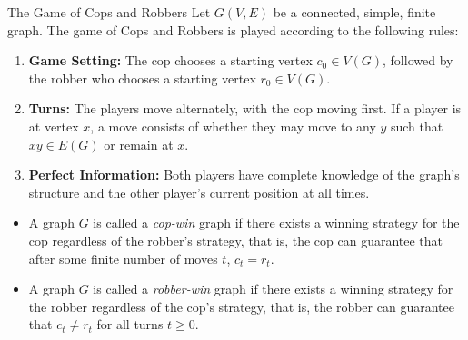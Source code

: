 \documentclass[12pt, a4paper]{article}
\begin{document}
\begin{definition}{The Game of Cops and Robbers}{}
Let $G(V, E)$ be a connected, simple, finite graph. The game of Cops and Robbers is played according to the following rules:
\begin{enumerate}
    \item \textbf{Game Setting:} The cop chooses a starting vertex $c_0 \in V(G)$, followed by the robber who chooses a starting vertex $r_0 \in V(G)$.
    \item \textbf{Turns:} The players move alternately, with the cop moving first. If a player is at vertex $x$, a move consists of whether they may move to any $y$ such that $xy \in E(G)$ or remain at $x$.
    \item \textbf{Perfect Information:} Both players have complete knowledge of the graph's structure and the other player's current position at all times.
\end{enumerate}
\end{definition}

\begin{definition}{}{}
\begin{itemize}
    \item A graph $G$ is called a \textit{cop-win} graph if there exists a winning strategy for the cop regardless of the robber's strategy, that is, the cop can guarantee that after some finite number of moves $t$, $c_t = r_t$. 
    \item A graph $G$ is called a \textit{robber-win} graph if there exists a winning strategy for the robber regardless of the cop's strategy, that is, the robber can guarantee that $c_t \neq r_t$ for all turns $t \ge 0$.
\end{itemize}
\end{definition}
\end{document}
